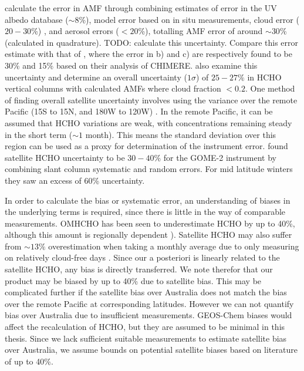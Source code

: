     \textcite{Palmer2006} calculate the error in AMF through combining estimates of error in the UV albedo database ($\sim 8$\%), model error based on in situ measurements, cloud error  ($20-30$\%) \parencite{Martin2003}, and aerosol errors ($<20$\%), totalling AMF error of around $\sim 30$\% (calculated in quadrature).
    TODO: calculate this uncertainty.
    Compare this error estimate with that of \textcite{Curci2010}, where the error in b) and c) are respectively found to be 30\% and 15\% based on their analysis of CHIMERE.
    \textcite{Millet2008} also examine this uncertainty and determine an overall uncertainty ($1\sigma$) of $25-27\%$ in HCHO vertical columns with calculated AMFs where cloud fraction $< 0.2$.
    One method of finding overall satellite uncertainty involves using the variance over the remote Pacific (15\degr S to 15\degr N, and 180\degr W to 120\degr W) \parencite[][]{DeSmedt2012,DeSmedt2015}.
    In the remote Pacific, it can be assumed that HCHO variations are weak, with concentrations remaining steady in the short term ($\sim 1$ month).
    This means the standard deviation over this region can be used as a proxy for determination of the instrument error.
    \textcite{DeSmedt2012} found satellite HCHO uncertainty to be $30-40\%$ for the GOME-2 instrument by combining slant column systematic and random errors.
    For mid latitude winters they saw an excess of 60\% uncertainty.
    
    In order to calculate the bias or systematic error, an understanding of biases in the underlying terms is required, since there is little in the way of comparable measurements.
    OMHCHO has been seen to underestimate HCHO by up to 40\%, although this amount is regionally dependent \parencite{Zhu2016,DeSmedt2015,Barkley2013}).
    Satellite HCHO may also suffer from $\sim13\%$ overestimation when taking a monthly average due to only measuring on relatively cloud-free days \parencite{Surl2018}.
    Since our a posteriori is linearly related to the satellite HCHO, any bias is directly transferred.
    We note therefor that our product may be biased by up to 40\% due to satellite bias.
    This may be complicated further if the satellite bias over Australia does not match the bias over the remote Pacific at corresponding latitudes.
    However we can not quantify bias over Australia due to insufficient measurements.
    GEOS-Chem biases would affect the recalculation of HCHO, but they are assumed to be minimal in this thesis.
    Since we lack sufficient suitable measurements to estimate satellite bias over Australia, we assume bounds on potential satellite biases based on literature of up to 40\%.
    
